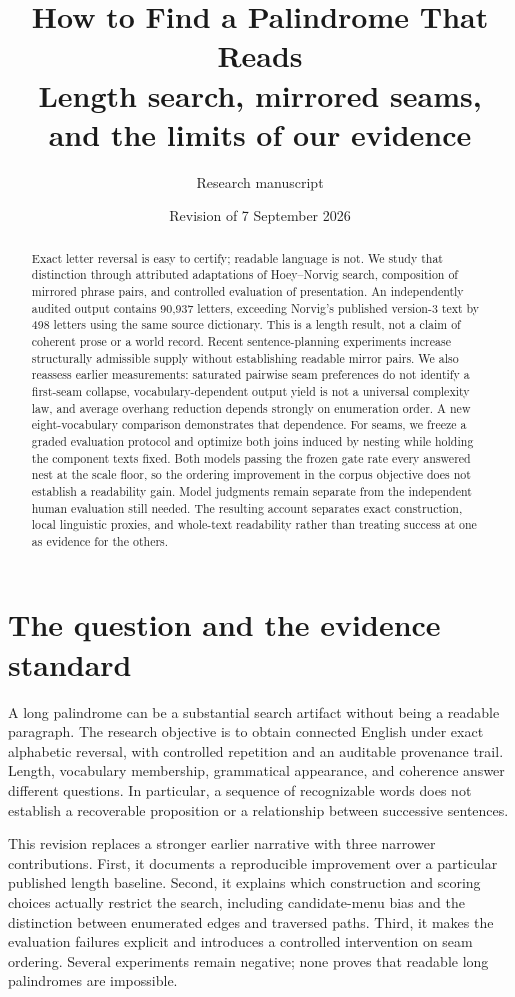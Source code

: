 \documentclass[11pt,letterpaper]{article}
\title{How to Find a Palindrome That Reads\\\large Length search, mirrored seams, and the limits of our evidence}
\author{Research manuscript}
\date{Revision of 7 September 2026}
\begin{document}
\maketitle\thispagestyle{plain}
\begin{abstract}
Exact letter reversal is easy to certify; readable language is not. We study that distinction through attributed adaptations of Hoey--Norvig search, composition of mirrored phrase pairs, and controlled evaluation of presentation. An independently audited output contains 90,937 letters, exceeding Norvig's published version-3 text by 498 letters using the same source dictionary. This is a length result, not a claim of coherent prose or a world record. Recent sentence-planning experiments increase structurally admissible supply without establishing readable mirror pairs. We also reassess earlier measurements: saturated pairwise seam preferences do not identify a first-seam collapse, vocabulary-dependent output yield is not a universal complexity law, and average overhang reduction depends strongly on enumeration order. A new eight-vocabulary comparison demonstrates that dependence. For seams, we freeze a graded evaluation protocol and optimize both joins induced by nesting while holding the component texts fixed. Both models passing the frozen gate rate every answered nest at the scale floor, so the ordering improvement in the corpus objective does not establish a readability gain. Model judgments remain separate from the independent human evaluation still needed. The resulting account separates exact construction, local linguistic proxies, and whole-text readability rather than treating success at one as evidence for the others.
\end{abstract}

\section{The question and the evidence standard}
A long palindrome can be a substantial search artifact without being a readable paragraph. The research objective is to obtain connected English under exact alphabetic reversal, with controlled repetition and an auditable provenance trail. Length, vocabulary membership, grammatical appearance, and coherence answer different questions. In particular, a sequence of recognizable words does not establish a recoverable proposition or a relationship between successive sentences.

This revision replaces a stronger earlier narrative with three narrower contributions. First, it documents a reproducible improvement over a particular published length baseline. Second, it explains which construction and scoring choices actually restrict the search, including candidate-menu bias and the distinction between enumerated edges and traversed paths. Third, it makes the evaluation failures explicit and introduces a controlled intervention on seam ordering. Several experiments remain negative; none proves that readable long palindromes are impossible.
\end{document}
